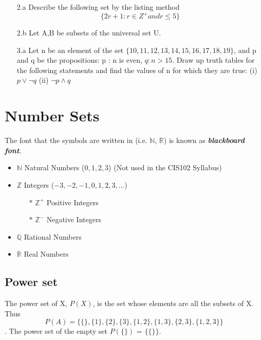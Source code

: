 \documentclass[]{report}
\begin{document}



\begin{itemize}
\item[2.a] Describe the following set by the listing method
\[ \{ 2r+1 : r \in Z^{+} and r \leq 5  \} \]
\item[2.b] Let A,B be subsets of the universal set U.


\end{itemize}
\begin{itemize}
\item[3.a]
Let n be an element of the set $\{10, 11, 12, 13, 14, 15, 16, 17, 18, 19\}$,
and p and q be the propositions:
p : n is even, $q : n > 15$.
Draw up truth tables for the following statements and find the values of n for
which they are true:
(i) $p \vee \neg q$
(ii) $\neg p \wedge q$
\end{itemize}

\section{Number Sets}
The font that the symbols are written in (i.e. $\mathbb{N}$, $\mathbb{R}$) is known as \textit{\textbf{blackboard font}}.
\begin{itemize}
\item $\mathbb{N}$ Natural Numbers ($0,1,2,3$) 
(Not used in the CIS102 Syllabus)
\item $\mathbb{Z}$ Integers ($-3,-2,-1,0,1,2,3, \ldots$)
\begin{itemize}
\item[$\ast$] $\mathbb{Z}^{+}$ Positive Integers
\item[$\ast$] $\mathbb{Z}^{-}$ Negative Integers
\end{itemize}
\item $\mathbb{Q}$ Rational Numbers
\item $\mathbb{R}$ Real Numbers
\end{itemize}

\subsection{Power set}

The power set of X, $P(X)$, is the set whose elements are all the subsets of X. Thus \[P(A) = \{ \{\}, \{1\}, \{2\}, \{3\}, \{1,2\}, \{1,3\}, \{2,3\}, \{1,2,3\}\}\]. The power set of the empty set $P(\{\})$ = $\{\{\}\}$. 
\end{document}
